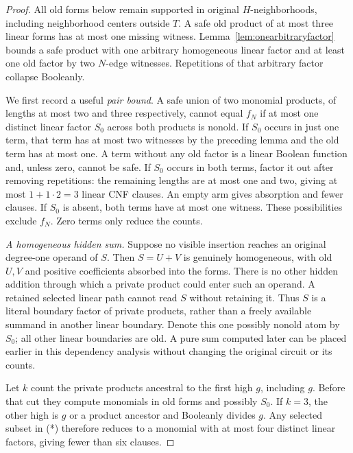 \documentclass[11pt]{article}
\theoremstyle{definition}
\theoremstyle{remark}
\begin{document}
\begin{proof}
All old forms below remain supported in original $H$-neighborhoods, including
neighborhood centers outside $T$. A safe old product of at most three linear
forms has at most one missing witness. Lemma~\ref{lem:onearbitraryfactor}
bounds a safe product with one arbitrary homogeneous linear factor and at
least one old factor by two $N$-edge witnesses. Repetitions of that arbitrary
factor collapse Booleanly.

We first record a useful \emph{pair bound}. A safe union of two monomial
products, of lengths at most two and three respectively, cannot equal $f_N$
if at most one distinct linear factor $S_0$ across both products is nonold.
If $S_0$ occurs in just one term, that term has at most two witnesses by the
preceding lemma and the old term has at most one. A term without any old
factor is a linear Boolean function and, unless zero, cannot be safe. If
$S_0$ occurs in both terms, factor it out after removing repetitions: the
remaining lengths are at most one and two, giving at most
$1+1\cdot2=3$ linear CNF clauses. An empty arm gives absorption and fewer
clauses. If $S_0$ is absent, both terms have at most one witness. These
possibilities exclude $f_N$. Zero terms only reduce the counts.

\emph{A homogeneous hidden sum.} Suppose no visible insertion reaches an
original degree-one operand of $S$. Then $S=U+V$ is genuinely homogeneous,
with old $U,V$ and positive coefficients absorbed into the forms. There is
no other hidden addition through which a private product could enter such
an operand. A retained selected linear path cannot read $S$ without
retaining it. Thus $S$ is a literal boundary factor of private products,
rather than a freely available summand in another linear boundary. Denote
this one possibly nonold atom by $S_0$; all other linear boundaries are old.
A pure sum computed later can be placed earlier in this dependency analysis
without changing the original circuit or its counts.

Let $k$ count the private products ancestral to the first high $g$, including
$g$. Before that cut they compute monomials in old forms and possibly $S_0$.
If $k=3$, the other high is $g$ or a product ancestor and Booleanly divides
$g$. Any selected subset in (*) therefore reduces to a monomial with at
most four distinct linear factors, giving fewer than six clauses.


\end{proof}
\end{document}

